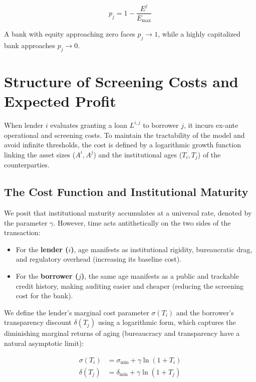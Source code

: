 \documentclass{article}
\begin{document}
\begin{equation}
    p_j = 1 - \frac{E^j}{E_{\max}}
\end{equation}

\noindent A bank with equity approaching zero faces $p_j \to 1$, while a highly capitalized bank approaches $p_j \to 0$.

\section{Structure of Screening Costs and Expected Profit}

\noindent When lender $i$ evaluates granting a loan $L^{i,j}$ to borrower $j$, it incurs ex-ante operational and screening costs. To maintain the tractability of the model and avoid infinite thresholds, the cost is defined by a logarithmic growth function linking the asset sizes ($A^i, A^j$) and the institutional ages ($T_i, T_j$) of the counterparties.

\subsection{The Cost Function and Institutional Maturity}

\noindent We posit that institutional maturity accumulates at a universal rate, denoted by the parameter $\gamma$. However, time acts antithetically on the two sides of the transaction:
\begin{itemize}
    \item For the \textbf{lender ($i$)}, age manifests as institutional rigidity, bureaucratic drag, and regulatory overhead (increasing its baseline cost).
    \item For the \textbf{borrower ($j$)}, the same age manifests as a public and trackable credit history, making auditing easier and cheaper (reducing the screening cost for the bank).
\end{itemize}

\noindent We define the lender's marginal cost parameter $\sigma(T_i)$ and the borrower's transparency discount $\delta(T_j)$ using a logarithmic form, which captures the diminishing marginal returns of aging (bureaucracy and transparency have a natural asymptotic limit):

\begin{align}
    \sigma(T_i) &= \sigma_{\min} + \gamma \ln(1 + T_i) \\
    \delta(T_j) &= \delta_{\min} + \gamma \ln(1 + T_j)
\end{align}
\end{document}
